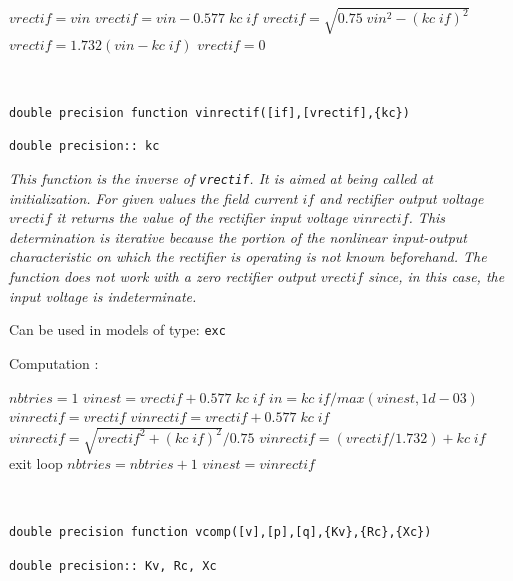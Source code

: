 {{\begin{minipage}[t]{15cm}
\begin{algorithmic}
  \STATE $vrectif=vin$
  \STATE $vrectif=vin - 0.577 \; kc \;if$
  \STATE $vrectif= \sqrt{0.75 \; vin^2 - (kc \; if)^2}$
  \STATE $vrectif=1.732 (vin - kc \; if)$ 
\ELSE
  \STATE $vrectif=0$
\ENDIF
\end{algorithmic}
\end{minipage}

~ \hrulefill ~

{\large \tt double precision function vinrectif([if],[vrectif],\{kc\})}

\hspace*{10ex} {\tt double precision:: kc}

{\it This function is the inverse of {\tt vrectif}. It is aimed at being called at initialization. For given values the field current $if$ and rectifier output voltage $vrectif$ it returns the value of the rectifier input voltage $vinrectif$. This determination is iterative because the portion of the nonlinear input-output characteristic on which the rectifier is operating is not known beforehand. The function does not work with a zero rectifier output $vrectif$ since, in this case, the input voltage is indeterminate.}

Can be used in models of type: {\tt exc}

Computation : 

\hspace*{20ex}\begin{minipage}[t]{15cm}
\begin{algorithmic}
\STATE $nbtries=1$
\STATE $vinest=vrectif+0.577 \; kc \;if$
\LOOP
\STATE $in=kc \; if / max(vinest,1d-03)$
  \STATE $vinrectif=vrectif$
  \STATE $vinrectif=vrectif + 0.577 \; kc \;if$
  \STATE $vinrectif= \sqrt{vrectif^2 + (kc \; if)^2}/0.75$
\ELSE
  \STATE $vinrectif=(vrectif/1.732)+ kc \; if$
\ENDIF
{}
  \STATE exit loop
\ENDIF
\STATE $nbtries=nbtries+1$
\STATE $vinest=vinrectif$
\ENDLOOP
\end{algorithmic}
\end{minipage}

~ \hrulefill ~

{\large \tt double precision function vcomp([v],[p],[q],\{Kv\},\{Rc\},\{Xc\})}

\hspace*{10ex} {\tt double precision:: Kv, Rc, Xc}

}}
